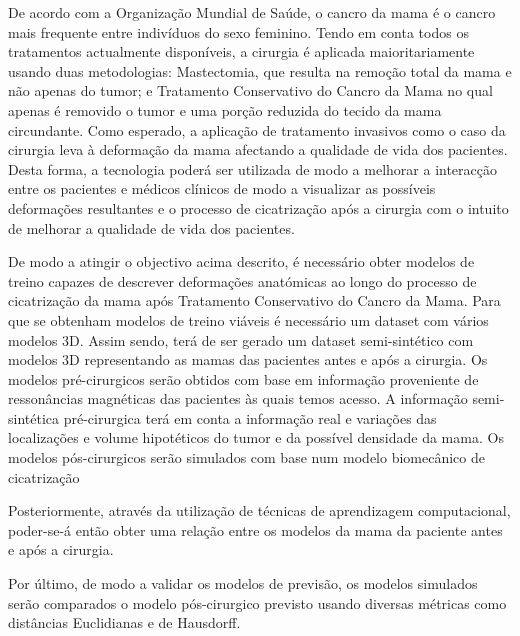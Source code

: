 De acordo com a Organização Mundial de Saúde, o cancro da mama é o cancro mais frequente entre indivíduos do sexo feminino. Tendo em conta todos os tratamentos actualmente disponíveis, a cirurgia é aplicada maioritariamente usando duas metodologias: Mastectomia, que resulta na remoção total da mama e não apenas do tumor; e Tratamento Conservativo do Cancro da Mama no qual apenas é removido o tumor e uma porção reduzida do tecido da mama circundante. Como esperado, a aplicação de tratamento invasivos como o caso da cirurgia leva à deformação da mama afectando a qualidade de vida dos pacientes. Desta forma, a tecnologia poderá ser utilizada de modo a melhorar a interacção entre os pacientes e médicos clínicos de modo a visualizar as possíveis deformações resultantes e o processo de cicatrização após a cirurgia com o intuito de melhorar a qualidade de vida dos pacientes.

De modo a atingir o objectivo acima descrito, é necessário obter modelos de treino capazes de descrever deformações anatómicas ao longo do processo de cicatrização da mama após Tratamento Conservativo do Cancro da Mama. Para que se obtenham modelos de treino viáveis é necessário um dataset com vários modelos 3D. Assim sendo, terá de ser gerado um dataset semi-sintético com modelos 3D representando as mamas das pacientes antes e após a cirurgia. Os modelos pré-cirurgicos serão obtidos com base em informação proveniente de ressonâncias magnéticas das pacientes às quais temos acesso. A informação semi-sintética pré-cirurgica terá em conta a informação real e variações das localizações e volume hipotéticos do tumor e da possível densidade da mama. Os modelos pós-cirurgicos serão simulados com base num modelo biomecânico de cicatrização

Posteriormente, através da utilização de técnicas de aprendizagem computacional, poder-se-á então obter uma relação entre os modelos da mama da paciente antes e após a cirurgia.

Por último, de modo a validar os modelos de previsão, os modelos simulados serão comparados o modelo pós-cirurgico previsto usando diversas métricas como distâncias Euclidianas e de Hausdorff. 